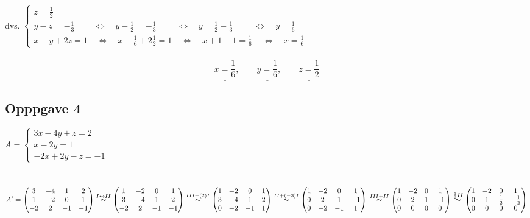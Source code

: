 \documentclass{article}
\newcommand{\uu}[1]{\underline{\underline{#1}}}
\newcommand{\eq}{\quad\Longleftrightarrow\quad}
\newcommand{\eqto}[1]{\overset{#1}{\sim}}
\begin{document}
dvs.
\(\begin{cases}
    z = \frac{1}{2} \\
    y-z=-\frac{1}{3} \ \quad \eq y -\frac{1}{2}=-\frac{1}{3} \ \, \quad \eq y = \frac{1}{2}-\frac{1}{3} \ \ \quad \eq y = \frac{1}{6} \\
    x-y+2z=1 \eq x-\frac{1}{6}+2\frac{1}{2}=1 \eq x+1-1 = \frac{1}{6} \, \eq x = \frac{1}{6}
\end{cases}\)
\\ \\ 
\[\uu{x = \frac{1}{6}}, \qquad \uu{y = \frac{1}{6}}, \qquad \uu{z = \frac{1}{2}}\]

\subsection*{Opppgave 4}
\(A = \begin{cases}
    3x-4y+z=2\\x-2y=1\\-2x+2y-z=-1
\end{cases}\)
\\ \\ \\
\(A' = \begin{pmatrix}
    3&-4&1&2\\1&-2&0&1\\-2&2&-1&-1
\end{pmatrix}
\eqto{I\leftrightarrow II}
\begin{pmatrix}
    1&-2&0&1\\3&-4&1&2\\-2&2&-1&-1
\end{pmatrix}
\eqto{III+(2)I}
\begin{pmatrix}
    1&-2&0&1\\3&-4&1&2\\0&-2&-1&1
\end{pmatrix}
\eqto{II+(-3)I}
\begin{pmatrix}
    1&-2&0&1\\0&2&1&-1\\0&-2&-1&1
\end{pmatrix} \\ \\ \\
\eqto{III+II}
\begin{pmatrix}
    1&-2&0&1\\0&2&1&-1\\0&0&0&0
\end{pmatrix}
\eqto{\frac{1}{2}II}
\begin{pmatrix}
    1&-2&0&1\\0&1&\frac{1}{2}&-\frac{1}{2}\\0&0&0&0
\end{pmatrix}
\)
\end{document}
